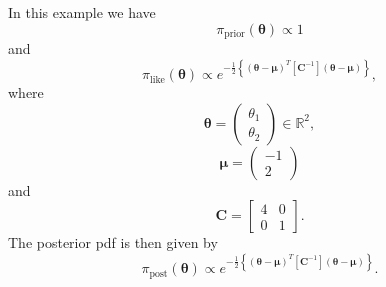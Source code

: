In this example we have
\begin{equation*}
\pi_{\text{prior}}(\boldsymbol{\theta}) \varpropto 1
\end{equation*}
and
\begin{equation*}
\pi_{\text{like}}(\boldsymbol{\theta}) \varpropto e^{-\frac{1}{2}\left\{(\boldsymbol{\theta}-\boldsymbol{\mu})^T[\mathbf{C}^{-1}](\boldsymbol{\theta}-\boldsymbol{\mu})\right\}},
\end{equation*}
where
\begin{equation*}
\boldsymbol{\theta} = 
\left(
\begin{array}{c}
\theta_1 \\
\theta_2
\end{array}
\right)\in \mathbb{R}^2,
\end{equation*}
%
\begin{equation}\label{eq-example-mu}
\boldsymbol{\mu} = 
\left(
\begin{array}{c}
-1 \\
2
\end{array}
\right)
\end{equation}
and
\begin{equation}\label{eq-example-cov-mat}
\mathbf{C} = 
\left[
\begin{array}{cc}
4 & 0 \\
0 & 1
\end{array}
\right].
\end{equation}
The posterior pdf is then given by
\begin{equation}\label{eq-example-post}
\pi_{\text{post}}(\boldsymbol{\theta}) \varpropto e^{-\frac{1}{2}\left\{(\boldsymbol{\theta}-\boldsymbol{\mu})^T[\mathbf{C}^{-1}](\boldsymbol{\theta}-\boldsymbol{\mu})\right\}}.
\end{equation}

